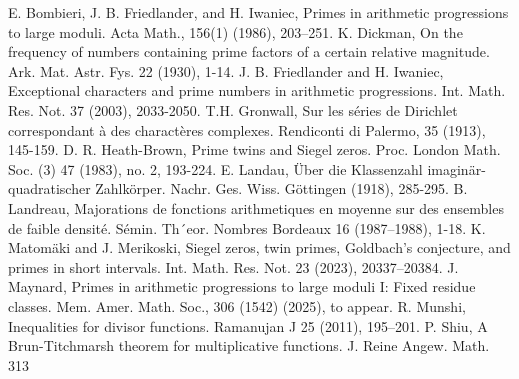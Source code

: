 \documentclass{amsart}
\begin{document}

%
\begin{thebibliography}{[HD]}
\normalsize
{} E. Bombieri, J. B. Friedlander, and H. Iwaniec, Primes in arithmetic progressions to large moduli.
Acta Math., 156(1) (1986), 203–251.
 K. Dickman, On the frequency of numbers containing prime factors
of a certain relative magnitude. Ark. Mat. Astr. Fys. 22 (1930), 1-14.
 J. B. Friedlander and H. Iwaniec, Exceptional characters and prime numbers in arithmetic progressions. Int. Math. Res. Not. 37 (2003), 2033-2050.
 T.H. Gronwall, Sur les s\'{e}ries de Dirichlet correspondant \`{a} des charact\`{e}res complexes. Rendiconti di Palermo, 35 (1913), 145-159.
 D. R. Heath-Brown, Prime twins and Siegel zeros. Proc. London Math. Soc. (3) 47 (1983), no. 2, 193-224.
 E. Landau, Über die Klassenzahl imaginär-quadratischer Zahlkörper. Nachr. Ges. Wiss. Göttingen (1918), 285-295.
 B. Landreau, Majorations de fonctions arithmetiques en moyenne sur des ensembles de faible
densit\'{e}. S\'{e}min. Th´eor. Nombres Bordeaux 16 (1987–1988), 1-18.
 K. Matom\"{a}ki and J. Merikoski, Siegel zeros, twin primes, Goldbach’s conjecture, and primes in short intervals. Int. Math. Res. Not. 23 (2023), 20337–20384.
 J. Maynard, Primes in arithmetic progressions to large moduli I: Fixed residue classes. Mem. Amer. Math. Soc., 306 (1542) (2025), to appear.
 R. Munshi, Inequalities for divisor functions. Ramanujan J 25 (2011), 195–201.
 P. Shiu, A Brun-Titchmarsh theorem for multiplicative functions. J. Reine Angew. Math. 313

\end{thebibliography}
\end{document}
